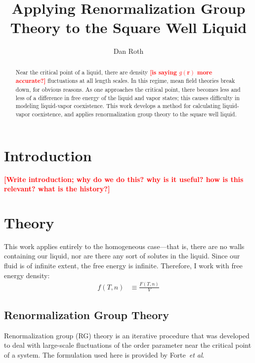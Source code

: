 \documentclass[letterpaper,twocolumn,amsmath,amssymb,prb]{revtex4-1}
\newcommand{\rr}{\ensuremath{\mathbf{r}}}
\newcommand{\1}{\ensuremath{\textbf{r}_1}}
\newcommand{\2}{\ensuremath{\textbf{r}_2}}
\newcommand{\3}{\ensuremath{\textbf{r}_3}}
\newcommand{\4}{\ensuremath{\textbf{r}_4}}
\newcommand{\fixme}[1]{\textcolor{red}{\textbf{[#1]}}}
\begin{document}
\title{Applying Renormalization Group Theory to the Square Well Liquid}

\author{Dan Roth}

\begin{abstract}

Near the critical point of a liquid, there are density \fixme{is
  saying $g(\rr)$ more accurate?} fluctuations at all length
scales. In this regime, mean field theories break down, for obvious
reasons. As one approaches the critical point, there becomes less and
less of a difference in free energy of the liquid and vapor states;
this causes difficulty in modeling liquid-vapor coexistence. This work
develops a method for calculating liquid-vapor coexistence, and
applies renormalization group theory to the square well liquid.

\end{abstract}

\maketitle

\section{Introduction}
\fixme{Write introduction; why do we do this? why is it useful? how is this relevant? what is the history?}

\section{Theory}\label{sec:theory}

This work applies entirely to the homogeneous case---that is, there
are no walls containing our liquid, nor are there any sort of solutes
in the liquid. Since our fluid is of infinite extent, the free energy
is infinite. Therefore, I work with free energy density:
\begin{align}
  f(T,n) &\equiv \frac{F(T,n)}{V}
\end{align}

\subsection{Renormalization Group Theory}\label{subsec:RGT}
Renormalization group (RG) theory is an iterative procedure that was
developed to deal with large-scale fluctuations of the order parameter
near the critical point of a system. The formulation used here is
provided by Forte~\textit{et al}.\cite{Forte11}
\end{document}
